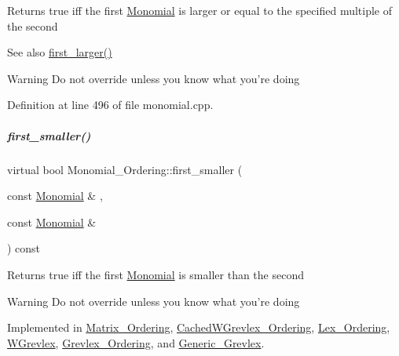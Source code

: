 \begin{DoxyReturn}{Returns}
{\ttfamily true} iff the first \hyperlink{group__polygroup_class_monomial}{Monomial} is larger or equal to the specified multiple of the second 
\end{DoxyReturn}
\begin{DoxySeeAlso}{See also}
\hyperlink{group__orderinggroup_aed41fe82e1ca5cd287a93d287fee7c20}{first\+\_\+larger()} 
\end{DoxySeeAlso}
\begin{DoxyWarning}{Warning}
Do not override unless you know what you're doing 
\end{DoxyWarning}


Definition at line 496 of file monomial.\+cpp.

\mbox{\label{group__orderinggroup_ab6c02638f87382f7a9a95b994e9a5dfb}} 
\subparagraph{\texorpdfstring{first\+\_\+smaller()}{first\_smaller()}}
{\footnotesize\ttfamily virtual bool Monomial\+\_\+\+Ordering\+::first\+\_\+smaller (\begin{DoxyParamCaption}\item[{const \hyperlink{group__polygroup_class_monomial}{Monomial} \&}]{,  }\item[{const \hyperlink{group__polygroup_class_monomial}{Monomial} \&}]{ }\end{DoxyParamCaption}) const\hspace{0.3cm}{\ttfamily [pure virtual]}}

\begin{DoxyReturn}{Returns}
{\ttfamily true} iff the first \hyperlink{group__polygroup_class_monomial}{Monomial} is smaller than the second 
\end{DoxyReturn}
\begin{DoxyWarning}{Warning}
Do not override unless you know what you're doing 
\end{DoxyWarning}


Implemented in \hyperlink{group__orderinggroup_ab7881ff6bbc52d02bf786ef8ab8c5c37}{Matrix\+\_\+\+Ordering}, \hyperlink{group__orderinggroup_a131b09d8226c2dc5f0718f90ab8e009f}{Cached\+W\+Grevlex\+\_\+\+Ordering}, \hyperlink{group__orderinggroup_ae42ea2c7b8fa45bcb46e56480d5f8abb}{Lex\+\_\+\+Ordering}, \hyperlink{group__orderinggroup_a0e4327be4c18de7180ba2cd8c2f9d549}{W\+Grevlex}, \hyperlink{group__orderinggroup_abb1afdfa6ace5b90e425d0645e278c67}{Grevlex\+\_\+\+Ordering}, and \hyperlink{group__orderinggroup_a48ba39468e17d826988b28f5d871d868}{Generic\+\_\+\+Grevlex}.

